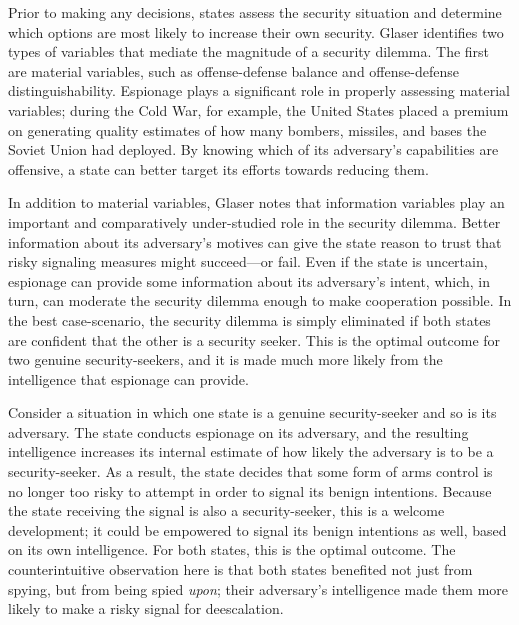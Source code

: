 \documentclass[14pt]{extarticle}
\begin{document}
Prior to making any decisions, states assess the security situation and determine which options are most likely to increase their own security. Glaser identifies two types of variables that mediate the magnitude of a security dilemma. The first are material variables, such as offense-defense balance and offense-defense distinguishability. Espionage plays a significant role in properly assessing material variables; during the Cold War, for example, the United States placed a premium on generating quality estimates of how many bombers, missiles, and bases the Soviet Union had deployed. By knowing which of its adversary's capabilities are offensive, a state can better target its efforts towards reducing them.

In addition to material variables, Glaser notes that information variables play an important and comparatively under-studied role in the security dilemma. Better information about its adversary's motives can give the state reason to trust that risky signaling measures might succeed---or fail. Even if the state is uncertain, espionage can provide some information about its adversary's intent, which, in turn, can moderate the security dilemma enough to make cooperation possible. In the best case-scenario, the security dilemma is simply eliminated if both states are confident that the other is a security seeker. This is the optimal outcome for two genuine security-seekers, and it is made much more likely from the intelligence that espionage can provide.

Consider a situation in which one state is a genuine security-seeker and so is its adversary. The state conducts espionage on its adversary, and the resulting intelligence increases its internal estimate of how likely the adversary is to be a security-seeker. As a result, the state decides that some form of arms control is no longer too risky to attempt in order to signal its benign intentions. Because the state receiving the signal is also a security-seeker, this is a welcome development; it could be empowered to signal its benign intentions as well, based on its own intelligence. For both states, this is the optimal outcome. The counterintuitive observation here is that both states benefited not just from spying, but from being spied \emph{upon}; their adversary's intelligence made them more likely to make a risky signal for deescalation.

\end{document}

